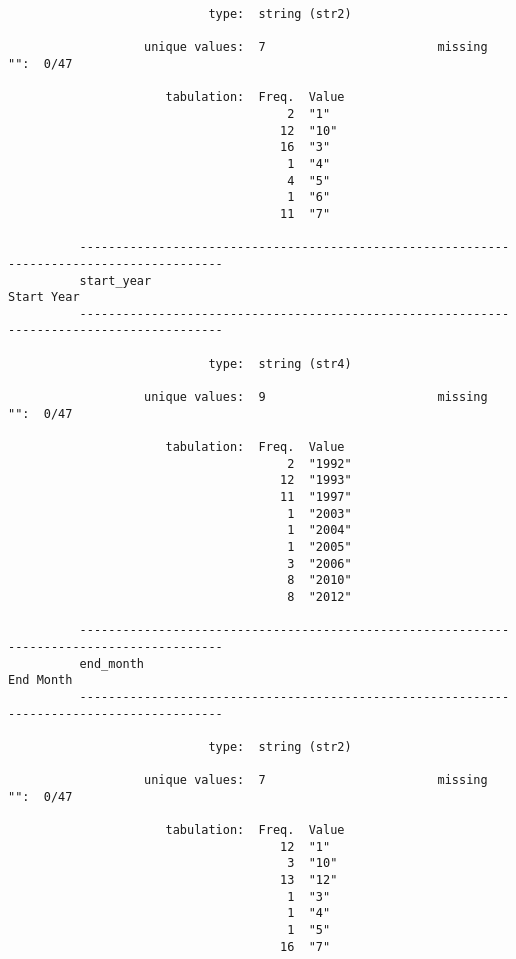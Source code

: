 \documentclass{article}
\begin{document}
\begin{verbatim}
                            type:  string (str2)
          
                   unique values:  7                        missing "":  0/47
          
                      tabulation:  Freq.  Value
                                       2  "1"
                                      12  "10"
                                      16  "3"
                                       1  "4"
                                       4  "5"
                                       1  "6"
                                      11  "7"
          
          ------------------------------------------------------------------------------------------
          start_year                                                                      Start Year
          ------------------------------------------------------------------------------------------
          
                            type:  string (str4)
          
                   unique values:  9                        missing "":  0/47
          
                      tabulation:  Freq.  Value
                                       2  "1992"
                                      12  "1993"
                                      11  "1997"
                                       1  "2003"
                                       1  "2004"
                                       1  "2005"
                                       3  "2006"
                                       8  "2010"
                                       8  "2012"
          
          ------------------------------------------------------------------------------------------
          end_month                                                                        End Month
          ------------------------------------------------------------------------------------------
          
                            type:  string (str2)
          
                   unique values:  7                        missing "":  0/47
          
                      tabulation:  Freq.  Value
                                      12  "1"
                                       3  "10"
                                      13  "12"
                                       1  "3"
                                       1  "4"
                                       1  "5"
                                      16  "7"
          

\end{verbatim}
\end{document}
